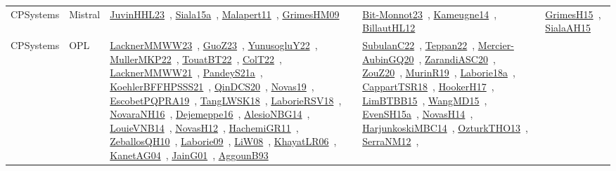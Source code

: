 {\begin{longtable}{lp{3cm}>{\raggedright\arraybackslash}p{6cm}>{\raggedright\arraybackslash}p{6cm}>{\raggedright\arraybackslash}p{8cm}}
CPSystems & Mistral & \href{works/JuvinHHL23.pdf}{JuvinHHL23}~\cite{JuvinHHL23}, \href{works/Siala15a.pdf}{Siala15a}~\cite{Siala15a}, \href{works/Malapert11.pdf}{Malapert11}~\cite{Malapert11}, \href{works/GrimesHM09.pdf}{GrimesHM09}~\cite{GrimesHM09} & \href{works/Bit-Monnot23.pdf}{Bit-Monnot23}~\cite{Bit-Monnot23}, \href{works/Kameugne14.pdf}{Kameugne14}~\cite{Kameugne14}, \href{works/BillautHL12.pdf}{BillautHL12}~\cite{BillautHL12} & \href{works/GrimesH15.pdf}{GrimesH15}~\cite{GrimesH15}, \href{works/SialaAH15.pdf}{SialaAH15}~\cite{SialaAH15}\\
CPSystems & OPL & \href{works/LacknerMMWW23.pdf}{LacknerMMWW23}~\cite{LacknerMMWW23}, \href{works/GuoZ23.pdf}{GuoZ23}~\cite{GuoZ23}, \href{works/YunusogluY22.pdf}{YunusogluY22}~\cite{YunusogluY22}, \href{works/MullerMKP22.pdf}{MullerMKP22}~\cite{MullerMKP22}, \href{works/TouatBT22.pdf}{TouatBT22}~\cite{TouatBT22}, \href{works/ColT22.pdf}{ColT22}~\cite{ColT22}, \href{works/LacknerMMWW21.pdf}{LacknerMMWW21}~\cite{LacknerMMWW21}, \href{works/PandeyS21a.pdf}{PandeyS21a}~\cite{PandeyS21a}, \href{works/KoehlerBFFHPSSS21.pdf}{KoehlerBFFHPSSS21}~\cite{KoehlerBFFHPSSS21}, \href{works/QinDCS20.pdf}{QinDCS20}~\cite{QinDCS20}, \href{works/Novas19.pdf}{Novas19}~\cite{Novas19}, \href{works/EscobetPQPRA19.pdf}{EscobetPQPRA19}~\cite{EscobetPQPRA19}, \href{works/TangLWSK18.pdf}{TangLWSK18}~\cite{TangLWSK18}, \href{works/LaborieRSV18.pdf}{LaborieRSV18}~\cite{LaborieRSV18}, \href{works/NovaraNH16.pdf}{NovaraNH16}~\cite{NovaraNH16}, \href{works/Dejemeppe16.pdf}{Dejemeppe16}~\cite{Dejemeppe16}, \href{works/AlesioNBG14.pdf}{AlesioNBG14}~\cite{AlesioNBG14}, \href{works/LouieVNB14.pdf}{LouieVNB14}~\cite{LouieVNB14}, \href{works/NovasH12.pdf}{NovasH12}~\cite{NovasH12}, \href{works/HachemiGR11.pdf}{HachemiGR11}~\cite{HachemiGR11}, \href{works/ZeballosQH10.pdf}{ZeballosQH10}~\cite{ZeballosQH10}, \href{works/Laborie09.pdf}{Laborie09}~\cite{Laborie09}, \href{works/LiW08.pdf}{LiW08}~\cite{LiW08}, \href{works/KhayatLR06.pdf}{KhayatLR06}~\cite{KhayatLR06}, \href{works/KanetAG04.pdf}{KanetAG04}~\cite{KanetAG04}, \href{works/JainG01.pdf}{JainG01}~\cite{JainG01}, \href{works/AggounB93.pdf}{AggounB93}~\cite{AggounB93} & \href{works/SubulanC22.pdf}{SubulanC22}~\cite{SubulanC22}, \href{works/Teppan22.pdf}{Teppan22}~\cite{Teppan22}, \href{works/Mercier-AubinGQ20.pdf}{Mercier-AubinGQ20}~\cite{Mercier-AubinGQ20}, \href{works/ZarandiASC20.pdf}{ZarandiASC20}~\cite{ZarandiASC20}, \href{works/ZouZ20.pdf}{ZouZ20}~\cite{ZouZ20}, \href{works/MurinR19.pdf}{MurinR19}~\cite{MurinR19}, \href{works/Laborie18a.pdf}{Laborie18a}~\cite{Laborie18a}, \href{works/CappartTSR18.pdf}{CappartTSR18}~\cite{CappartTSR18}, \href{works/HookerH17.pdf}{HookerH17}~\cite{HookerH17}, \href{works/LimBTBB15.pdf}{LimBTBB15}~\cite{LimBTBB15}, \href{works/WangMD15.pdf}{WangMD15}~\cite{WangMD15}, \href{works/EvenSH15a.pdf}{EvenSH15a}~\cite{EvenSH15a}, \href{works/NovasH14.pdf}{NovasH14}~\cite{NovasH14}, \href{works/HarjunkoskiMBC14.pdf}{HarjunkoskiMBC14}~\cite{HarjunkoskiMBC14}, \href{works/OzturkTHO13.pdf}{OzturkTHO13}~\cite{OzturkTHO13}, \href{works/SerraNM12.pdf}{SerraNM12}~\cite{SerraNM12}, 
\end{longtable}}
